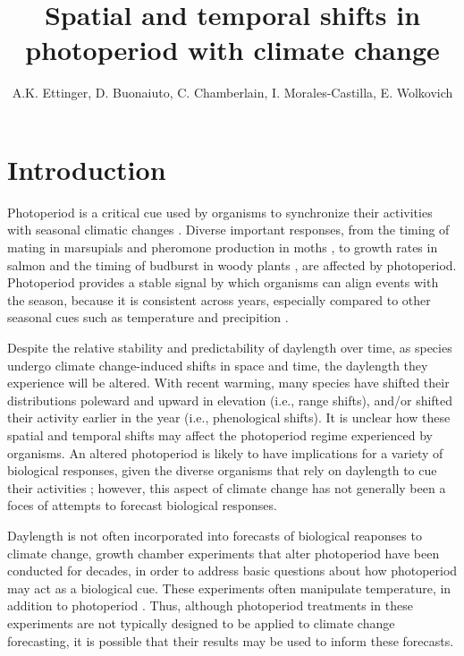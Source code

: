 \documentclass{article}
\begin{document}
 
\title{Spatial and temporal shifts in photoperiod with climate change} %

\author{A.K. Ettinger, D. Buonaiuto, C. Chamberlain, I. Morales-Castilla, E. Wolkovich}
\maketitle  %

\section*{Introduction}
\par Photoperiod is a critical cue used by organisms to synchronize their activities with seasonal climatic changes \citep[e.g.,][]{Hsu:2011,Singh:2017,Basler:2012}. Diverse important responses, from the timing of mating in marsupials \citep{mcallan2006} and pheromone production in moths \citep{linn1996}, to growth rates in salmon and the timing of budburst in woody plants \citep{Flynn:2018,solbakken1994}, are affected by photoperiod. Photoperiod provides a stable signal by which organisms can align events with the season, because it is consistent across years, especially compared to other seasonal cues such as temperature and precipition \citep{saikkonen2012}. 
\par Despite the relative stability and predictability of daylength over time, as species undergo climate change-induced shifts in space and time, the daylength they experience will be altered. With recent warming, many species have shifted their distributions poleward and upward in elevation (i.e., range shifts), and/or shifted their activity earlier in the year (i.e., phenological shifts). It is unclear how these spatial and temporal shifts may affect the photoperiod regime experienced by organisms. An altered photoperiod is likely to have implications for a variety of biological responses, given the diverse organisms that rely on daylength to cue their activities \citep[e.g.,][] {mcallan2006,linn1996,Flynn:2018,solbakken1994}; however,  this aspect of climate change has not generally been a foces of attempts to forecast biological responses.
\par Daylength is not often incorporated into forecasts of biological reaponses to climate change, growth chamber experiments that alter photoperiod have been conducted for decades, in order to address basic questions about how photoperiod may act as a biological cue. These experiments often manipulate temperature, in addition to photoperiod \citep[e.g.,][]{Campbell:1975aa,HEIDE:1977aa,Falusi:1990aa,Spann:2004aa,Laube:2014a}. Thus, although photoperiod treatments in these experiments are not typically designed to be applied to climate change forecasting, it is possible that their results may be used to inform these forecasts. 
\end{document}
